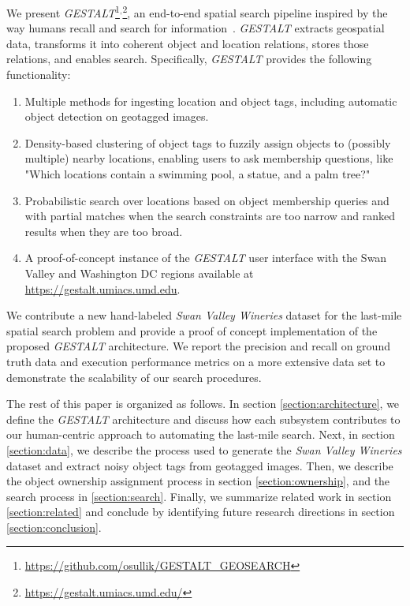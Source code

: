 We present \emph{GESTALT}\footnote{\url{https://github.com/osullik/GESTALT_GEOSEARCH}}$^,$\footnote{\url{https://gestalt.umiacs.umd.edu/}}, an end-to-end spatial search pipeline inspired by the way humans recall and search for information~\cite{Helbing2020, Oliveira2016, Weisberg2016}.
\emph{GESTALT} extracts geospatial data, transforms it into coherent object and location relations, stores those relations, and enables search. 
Specifically, \emph{GESTALT} provides the following functionality:
\begin{enumerate}
    \item Multiple methods for ingesting location and object tags, including automatic object detection on geotagged images.
    \item Density-based clustering of object tags to fuzzily assign objects to (possibly multiple) nearby locations, enabling users to ask membership questions, like "Which locations contain a swimming pool, a statue, and a palm tree?"
    \item Probabilistic search over locations based on object membership queries and with partial matches when the search constraints are too narrow and ranked results when they are too broad.
    \item A proof-of-concept instance of the \emph{GESTALT} user interface with the Swan Valley and Washington DC regions available at \url{https://gestalt.umiacs.umd.edu}.
\end{enumerate}

We contribute a new hand-labeled \textit{Swan Valley Wineries} dataset for the last-mile spatial search problem and provide a proof of concept implementation of the proposed \emph{GESTALT} architecture. We report the precision and recall on ground truth data and execution performance metrics on a more extensive data set to demonstrate the scalability of our search procedures.

The rest of this paper is organized as follows. In section \ref{section:architecture}, we define the \emph{GESTALT} architecture and discuss how each subsystem contributes to our human-centric approach to automating the last-mile search. 
Next, in section \ref{section:data}, we describe the process used to generate the \textit{Swan Valley Wineries} dataset and extract noisy object tags from geotagged images. Then, we describe the object ownership assignment process in section \ref{section:ownership}, and the search process in \ref{section:search}. 
Finally, we summarize related work in section \ref{section:related} and conclude by identifying future research directions in section \ref{section:conclusion}.

